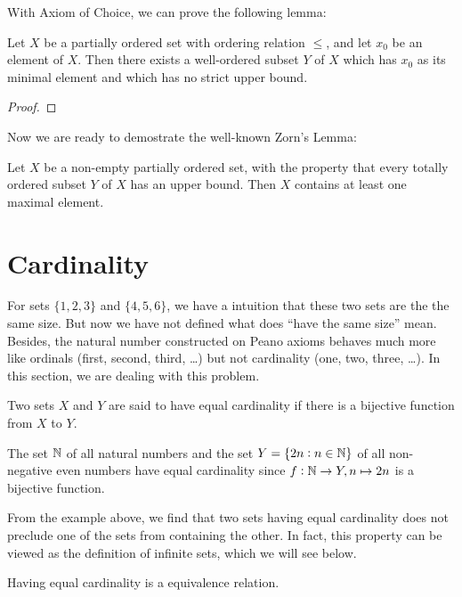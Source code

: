 With Axiom of Choice, we can prove the following lemma: 
\begin{lemma}
Let $X$ be a partially ordered set with ordering relation $\le$, and let 
$x_0$ be an element of $X$. 
Then there exists a well-ordered subset $Y$ of $X$ which has $x_0$ as its 
minimal element and which has no strict upper bound. 
\end{lemma}
\begin{proof}

\end{proof}

Now we are ready to demostrate the well-known Zorn's Lemma: 
\begin{lemma}\label{lemma:zorn_lemma}
Let $X$ be a non-empty partially ordered set, with the property that every 
totally ordered subset $Y$ of $X$ has an upper bound. 
Then $X$ contains at least one maximal element. 
\end{lemma}
\section{Cardinality}
For sets $\{1, 2, 3\}$ and $\{4, 5, 6\}$, we have a intuition that these two 
sets are the the same size. 
But now we have not defined what does ``have the same size'' mean. 
Besides, the natural number constructed on Peano axioms behaves much more 
like ordinals (first, second, third, \dots) but not cardinality (one, two, 
three, \dots). 
In this section, we are dealing with this problem. 
\begin{defn}
Two sets $X$ and $Y$ are said to have equal cardinality if there is a 
bijective function from $X$ to $Y$. 
\end{defn}

\begin{example}
The set $\mathbb{N}$ of all natural numbers and the set $Y = \{2n: n \in \mathbb{N} \}$ 
of all non-negative even numbers have equal cardinality since $f: \mathbb{N} \to Y, 
n \mapsto 2n$ is a bijective function. 
\end{example}

From the example above, we find that two sets having equal cardinality does 
not preclude one of the sets from containing the other. 
In fact, this property can be viewed as the definition of infinite sets, 
which we will see below. 

\begin{prop}
Having equal cardinality is a equivalence relation. 
\end{prop}

